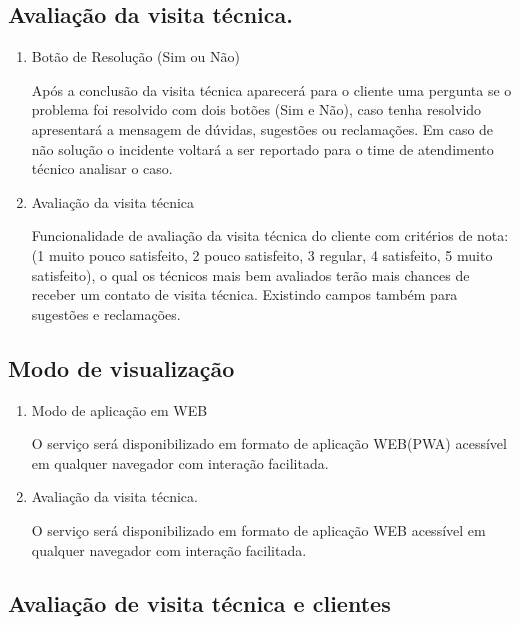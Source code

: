 \subsection{Avaliação da visita técnica.}

\begin{enumerate}
	
	\item Botão de Resolução (Sim ou Não)
	
	Após a conclusão da visita técnica aparecerá para o cliente uma pergunta se o problema foi resolvido com dois botões (Sim e Não), caso tenha resolvido apresentará a mensagem de dúvidas, sugestões ou reclamações. Em caso de não solução o incidente voltará a ser reportado para o time de atendimento técnico analisar o caso. 
	
	\item Avaliação da visita técnica
	
	Funcionalidade de avaliação da visita técnica do cliente com critérios de nota:(1 muito pouco satisfeito, 2 pouco satisfeito, 3 regular, 4 satisfeito, 5 muito satisfeito), o qual os técnicos mais bem avaliados terão mais chances de receber um contato de visita técnica. Existindo campos também para sugestões e reclamações.
	
\end{enumerate}

\subsection{Modo de visualização}

\begin{enumerate}
	
	\item Modo de aplicação em WEB
	
	O serviço será disponibilizado em formato de aplicação WEB(PWA) acessível em qualquer navegador com interação facilitada.
	
	\item Avaliação da visita técnica.
	
	O serviço será disponibilizado em formato de aplicação WEB acessível em qualquer navegador com interação facilitada.
	
\end{enumerate}

\subsection{Avaliação de visita técnica e clientes}

